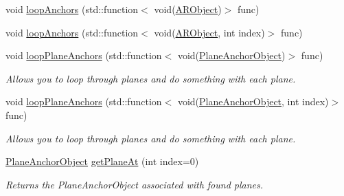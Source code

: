 \begin{DoxyCompactItemize}
void \hyperlink{class_a_r_core_1_1_a_r_anchor_manager_a687246a5f0aacaac63053c0e05081e11}{loop\+Anchors} (std\+::function$<$ void(\hyperlink{struct_a_r_objects_1_1_a_r_object}{A\+R\+Object})$>$ func)
\item 
void \hyperlink{class_a_r_core_1_1_a_r_anchor_manager_a03ee4092b5d958f8b1467e0a0e62f9b9}{loop\+Anchors} (std\+::function$<$ void(\hyperlink{struct_a_r_objects_1_1_a_r_object}{A\+R\+Object}, int index)$>$ func)
\item 
\mbox{\label{class_a_r_core_1_1_a_r_anchor_manager_a170e30f7226b84eaede22392f08d5521}} 
void \hyperlink{class_a_r_core_1_1_a_r_anchor_manager_a170e30f7226b84eaede22392f08d5521}{loop\+Plane\+Anchors} (std\+::function$<$ void(\hyperlink{struct_a_r_objects_1_1_plane_anchor_object}{Plane\+Anchor\+Object})$>$ func)
\begin{DoxyCompactList}\small\item\em Allows you to loop through planes and do something with each plane. \end{DoxyCompactList}\item 
\mbox{\label{class_a_r_core_1_1_a_r_anchor_manager_a6f3215e085a92b1165b3da58138adbfc}} 
void \hyperlink{class_a_r_core_1_1_a_r_anchor_manager_a6f3215e085a92b1165b3da58138adbfc}{loop\+Plane\+Anchors} (std\+::function$<$ void(\hyperlink{struct_a_r_objects_1_1_plane_anchor_object}{Plane\+Anchor\+Object}, int index)$>$ func)
\begin{DoxyCompactList}\small\item\em Allows you to loop through planes and do something with each plane. \end{DoxyCompactList}\item 
\mbox{\label{class_a_r_core_1_1_a_r_anchor_manager_ac885fded5a2a2f5c0b58506786e069f1}} 
\hyperlink{struct_a_r_objects_1_1_plane_anchor_object}{Plane\+Anchor\+Object} \hyperlink{class_a_r_core_1_1_a_r_anchor_manager_ac885fded5a2a2f5c0b58506786e069f1}{get\+Plane\+At} (int index=0)
\begin{DoxyCompactList}\small\item\em Returns the Plane\+Anchor\+Object associated with found planes. \end{DoxyCompactList}\item 
\mbox{\label{class_a_r_core_1_1_a_r_anchor_manager_a78da6cdbe64e12e49dc67adef5ac085b}} 

\end{DoxyCompactItemize}
